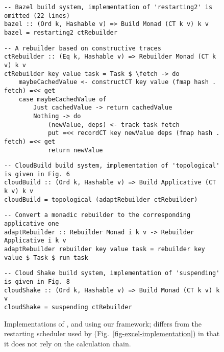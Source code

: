 \begin{figure}
\begin{verbatim}
-- Bazel build system, implementation of 'restarting2' is omitted (22 lines)
bazel :: (Ord k, Hashable v) => Build Monad (CT k v) k v
bazel = restarting2 ctRebuilder
\end{verbatim}
\vspace{1mm}
\begin{verbatim}
-- A rebuilder based on constructive traces
ctRebuilder :: (Eq k, Hashable v) => Rebuilder Monad (CT k v) k v
ctRebuilder key value task = Task $ \fetch -> do
    maybeCachedValue <- constructCT key value (fmap hash . fetch) =<< get
    case maybeCachedValue of
        Just cachedValue -> return cachedValue
        Nothing -> do
            (newValue, deps) <- track task fetch
            put =<< recordCT key newValue deps (fmap hash . fetch) =<< get
            return newValue
\end{verbatim}
\vspace{1mm}
\begin{verbatim}
-- CloudBuild build system, implementation of 'topological' is given in Fig. 6
cloudBuild :: (Ord k, Hashable v) => Build Applicative (CT k v) k v
cloudBuild = topological (adaptRebuilder ctRebuilder)
\end{verbatim}
\vspace{1mm}
\begin{verbatim}
-- Convert a monadic rebuilder to the corresponding applicative one
adaptRebuilder :: Rebuilder Monad i k v -> Rebuilder Applicative i k v
adaptRebuilder rebuilder key value task = rebuilder key value $ Task $ run task
\end{verbatim}
\vspace{1mm}
\begin{verbatim}
-- Cloud Shake build system, implementation of 'suspending' is given in Fig. 8
cloudShake :: (Ord k, Hashable v) => Build Monad (CT k v) k v
cloudShake = suspending ctRebuilder
\end{verbatim}
\vspace{-2mm}
\caption{Implementations of \Bazel, \CloudBuild and \Cloud \Shake using our
framework;  differs from the restarting scheduler used by \Excel
(Fig.~\ref{fig-excel-implementation}) in that it does not rely on the
calculation chain.}
\label{fig-bazel-cloud-shake-implementation}
\vspace{-4mm}
\end{figure}

